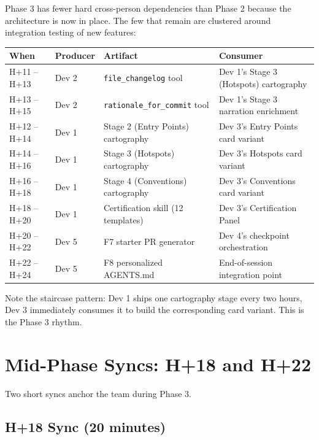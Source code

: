 \documentclass[11pt,letterpaper]{article}
\begin{document}
Phase 3 has fewer hard cross-person dependencies than Phase 2 because the architecture is now in place. The few that remain are clustered around integration testing of new features:

\begin{longtable}{|p{1.4cm}|p{2.6cm}|p{4cm}|p{6cm}|}
\hline
\rowcolor{ibmblue!10}
\textbf{When} & \textbf{Producer} & \textbf{Artifact} & \textbf{Consumer} \\
\hline
H+11 -- H+13 & Dev 2 & \texttt{file\_changelog} tool & Dev 1's Stage 3 (Hotspots) cartography \\
\hline
H+13 -- H+15 & Dev 2 & \texttt{rationale\_for\_commit} tool & Dev 1's Stage 3 narration enrichment \\
\hline
H+12 -- H+14 & Dev 1 & Stage 2 (Entry Points) cartography & Dev 3's Entry Points card variant \\
\hline
H+14 -- H+16 & Dev 1 & Stage 3 (Hotspots) cartography & Dev 3's Hotspots card variant \\
\hline
H+16 -- H+18 & Dev 1 & Stage 4 (Conventions) cartography & Dev 3's Conventions card variant \\
\hline
H+18 -- H+20 & Dev 1 & Certification skill (12 templates) & Dev 3's Certification Panel \\
\hline
H+20 -- H+22 & Dev 5 & F7 starter PR generator & Dev 4's checkpoint orchestration \\
\hline
H+22 -- H+24 & Dev 5 & F8 personalized AGENTS.md & End-of-session integration point \\
\hline
\end{longtable}

Note the staircase pattern: Dev 1 ships one cartography stage every two hours, Dev 3 immediately consumes it to build the corresponding card variant. This is the Phase 3 rhythm.

\section{Mid-Phase Syncs: H+18 and H+22}

Two short syncs anchor the team during Phase 3.

\subsection{H+18 Sync (20 minutes)}
\end{document}
